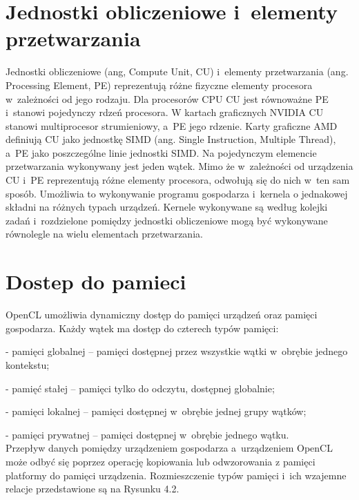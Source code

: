 \section{Jednostki obliczeniowe i~elementy przetwarzania}\label{sec:OpenC3L}

Jednostki obliczeniowe (ang, Compute Unit, CU) i~elementy przetwarzania (ang. Processing Element, PE) reprezentują różne fizyczne elementy procesora w~zależności od jego rodzaju. Dla procesorów CPU CU jest równoważne PE i~stanowi pojedynczy rdzeń procesora. W kartach graficznych NVIDIA CU stanowi multiprocesor strumieniowy, a~PE jego rdzenie. Karty graficzne AMD definiują CU jako jednostkę SIMD (ang. Single Instruction, Multiple Thread), a~PE jako poszczególne linie jednostki SIMD. Na pojedynczym elemencie przetwarzania wykonywany jest jeden wątek. Mimo że w~zależności od urządzenia CU i~PE reprezentują różne elementy procesora, odwołują się do nich w~ten sam sposób. Umożliwia to wykonywanie programu gospodarza i~kernela o jednakowej składni na różnych typach urządzeń. Kernele wykonywane są według kolejki zadań i~rozdzielone pomiędzy jednostki obliczeniowe mogą być wykonywane równolegle na wielu elementach przetwarzania.

\section{Dostep do pamieci}\label{sec:OpenC6L}

OpenCL umożliwia dynamiczny dostęp do pamięci urządzeń oraz pamięci gospodarza. Każdy wątek ma dostęp do czterech typów pamięci:

- pamięci globalnej – pamięci dostępnej przez wszystkie wątki w~obrębie jednego kontekstu;

- pamięć stałej – pamięci tylko do odczytu, dostępnej globalnie;

- pamięci lokalnej – pamięci dostępnej w~obrębie jednej grupy wątków;

- pamięci prywatnej – pamięci dostępnej w~obrębie jednego wątku.
\\

Przepływ danych pomiędzy urządzeniem gospodarza a~urządzeniem OpenCL może odbyć się poprzez operację kopiowania  lub odwzorowania z pamięci platformy do pamięci urządzenia. Rozmieszczenie typów pamięci i~ich wzajemne relacje przedstawione są na Rysunku 4.2.

